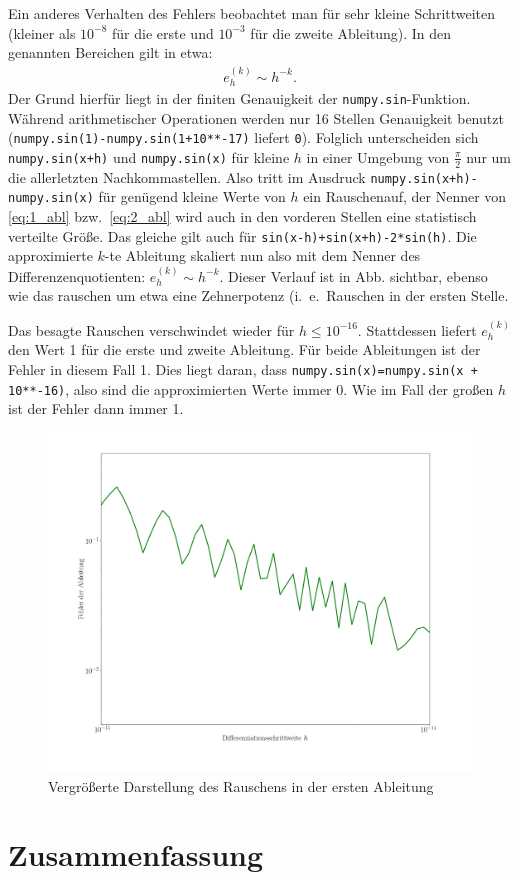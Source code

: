 \documentclass[smallheadings]{scrartcl}
\begin{document}
Ein anderes Verhalten des Fehlers beobachtet man für sehr kleine Schrittweiten (kleiner als $10^{-8}$ für die erste und $10^{-3}$ für die zweite Ableitung).
In den genannten Bereichen gilt in etwa:
\begin{align}
e_h^{(k)}\sim h^{-k}.
\end{align}
Der Grund hierfür liegt in der finiten Genauigkeit der \texttt{numpy.sin}-Funktion. Während arithmetischer Operationen werden nur 16 Stellen Genauigkeit benutzt\\ (\texttt{numpy.sin(1)-numpy.sin(1+10**-17)}  liefert \texttt{0}). Folglich unterscheiden sich \texttt{numpy.sin(x+h)} und \texttt{numpy.sin(x)} für kleine $h$ in einer Umgebung von $\frac{\pi}{2}$ nur um die allerletzten Nachkommastellen. Also tritt im Ausdruck \texttt{numpy.sin(x+h)-numpy.sin(x)} für genügend kleine Werte von $h$ ein \glqq Rauschen\grqq auf, der Nenner von \eqref{eq:1_abl} bzw.~\eqref{eq:2_abl} wird auch in den vorderen Stellen eine statistisch verteilte Größe. Das gleiche gilt auch für \texttt{sin(x-h)+sin(x+h)-2*sin(h)}. Die approximierte $k$-te Ableitung skaliert nun also mit dem Nenner des Differenzenquotienten: $e_h^{(k)}\sim h^{-k}$. Dieser Verlauf ist in Abb. %
sichtbar, ebenso wie das rauschen um etwa eine Zehnerpotenz (i.~e.~Rauschen in der ersten Stelle.

Das besagte Rauschen verschwindet wieder für $h\leq 10^{-16}$. Stattdessen liefert $e_h^{(k)}$ den Wert 1 für die erste und zweite Ableitung. %
Für beide Ableitungen ist der Fehler in diesem Fall 1. Dies liegt daran, dass \texttt{numpy.sin(x)=numpy.sin(x + 10**-16)}, also sind die approximierten Werte immer 0. Wie im Fall der großen $h$ ist der Fehler dann immer 1.

\begin{figure}[H]
	\includegraphics[width=\linewidth]{Bilder/rauschen}
	\caption{Vergrößerte Darstellung des Rauschens in der ersten Ableitung}
	\label{im:rauschen}
\end{figure}

\section{Zusammenfassung}

\end{document}
